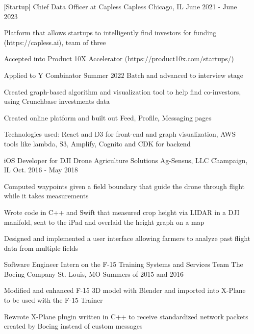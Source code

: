 \begin{cventries}
  \cventry
    {[Startup] Chief Data Officer at Capless} %
    {Capless} %
    {Chicago, IL} %
    {June 2021 - June 2023} %
    {
      \begin{cvitems} %
        \item {Platform that allows startups to intelligently find investors for funding (https://capless.ai), team of three}
        \item {Accepted into Product 10X Accelerator (https://product10x.com/startups/)}
        \item {Applied to Y Combinator Summer 2022 Batch and advanced to interview stage}
        \item {Created graph-based algorithm and visualization tool to help find co-investors, using Crunchbase investments data}
        \item {Created online platform and built out Feed, Profile, Messaging pages}
        \item {Technologies used: React and D3 for front-end and graph visualization, AWS tools like lambda, S3, Amplify, Cognito and CDK for backend }
      \end{cvitems}
    }

  \cventry
    {iOS Developer for DJI Drone Agriculture Solutions} %
    {Ag-Sensus, LLC} %
    {Champaign, IL} %
    {Oct. 2016 - May 2018} %
    {
      \begin{cvitems} %
        \item {Computed waypoints given a field boundary that guide the drone through flight while it takes measurements}
        \item {Wrote code in C++ and Swift that measured crop height via LIDAR in a DJI manifold, sent to the iPad and overlaid the height graph on a map}
        \item {Designed and implemented a user interface allowing farmers to analyze past flight data from multiple fields}
      \end{cvitems}
    }

  \cventry
    {Software Engineer Intern on the F-15 Training Systems and Services Team} %
    {The Boeing Company} %
    {St. Louis, MO} %
    {Summers of 2015 and 2016} %
    {
      \begin{cvitems} %
        \item {Modified and enhanced F-15 3D model with Blender and imported into X-Plane to be used with the F-15 Trainer}
        \item {Rewrote X-Plane plugin written in C++ to receive standardized network packets created by Boeing instead of custom messages}
      \end{cvitems}
    }

\end{cventries}

